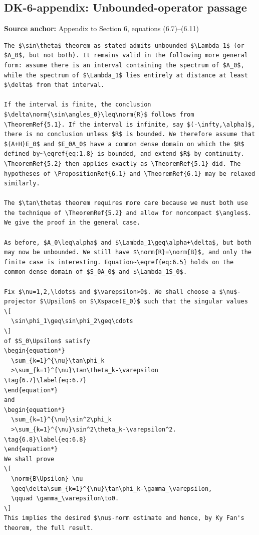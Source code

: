 \subsection*{DK-6-appendix: Unbounded-operator passage}
\noindent\textbf{Source anchor:} Appendix to Section 6, equations (6.7)–(6.11)\\
\begin{verbatim}
The $\sin\theta$ theorem as stated admits unbounded $\Lambda_1$ (or $A_0$, but not both). It remains valid in the following more general form: assume there is an interval containing the spectrum of $A_0$, while the spectrum of $\Lambda_1$ lies entirely at distance at least $\delta$ from that interval.

If the interval is finite, the conclusion $\delta\norm{\sin\angles_0}\leq\norm{R}$ follows from \TheoremRef{5.1}. If the interval is infinite, say $(-\infty,\alpha]$, there is no conclusion unless $R$ is bounded. We therefore assume that $(A+H)E_0$ and $E_0A_0$ have a common dense domain on which the $R$ defined by~\eqref{eq:1.8} is bounded, and extend $R$ by continuity. \TheoremRef{5.2} then applies exactly as \TheoremRef{5.1} did. The hypotheses of \PropositionRef{6.1} and \TheoremRef{6.1} may be relaxed similarly.

The $\tan\theta$ theorem requires more care because we must both use the technique of \TheoremRef{5.2} and allow for noncompact $\angles$. We give the proof in the general case.

As before, $A_0\leq\alpha$ and $\Lambda_1\geq\alpha+\delta$, but both may now be unbounded. We still have $\norm{R}=\norm{B}$, and only the finite case is interesting. Equation~\eqref{eq:6.5} holds on the common dense domain of $S_0A_0$ and $\Lambda_1S_0$.

Fix $\nu=1,2,\ldots$ and $\varepsilon>0$. We shall choose a $\nu$-projector $\Upsilon$ on $\Xspace(E_0)$ such that the singular values
\[
  \sin\phi_1\geq\sin\phi_2\geq\cdots
\]
of $S_0\Upsilon$ satisfy
\begin{equation*}
  \sum_{k=1}^{\nu}\tan\phi_k
  >\sum_{k=1}^{\nu}\tan\theta_k-\varepsilon
\tag{6.7}\label{eq:6.7}
\end{equation*}
and
\begin{equation*}
  \sum_{k=1}^{\nu}\sin^2\phi_k
  >\sum_{k=1}^{\nu}\sin^2\theta_k-\varepsilon^2.
\tag{6.8}\label{eq:6.8}
\end{equation*}
We shall prove
\[
  \norm{B\Upsilon}_\nu
  \geq\delta\sum_{k=1}^{\nu}\tan\phi_k-\gamma_\varepsilon,
  \qquad \gamma_\varepsilon\to0.
\]
This implies the desired $\nu$-norm estimate and hence, by Ky Fan's theorem, the full result.


\end{verbatim}
